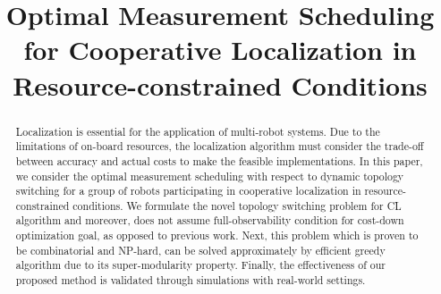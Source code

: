 \documentclass[conference]{IEEEtran}
\begin{document}
\title{Optimal Measurement Scheduling for Cooperative Localization in Resource-constrained Conditions}


\author{
\and
{}
}




%


\maketitle

\begin{abstract}
Localization is essential for the application of multi-robot systems.
Due to the limitations of on-board resources, the localization algorithm must consider the trade-off between accuracy and actual costs to make the feasible implementations.
In this paper, we consider the optimal measurement scheduling with respect to dynamic topology switching for a group of robots participating in cooperative localization in resource-constrained conditions.
We formulate the novel topology switching problem for CL algorithm and moreover, does not assume full-observability condition for cost-down optimization goal, as opposed to previous work.
Next, this problem which is proven to be combinatorial and NP-hard, can be solved approximately by efficient greedy algorithm due to its super-modularity property.
Finally, the effectiveness of our proposed method is validated through simulations with real-world settings.
\end{abstract}
\end{document}
